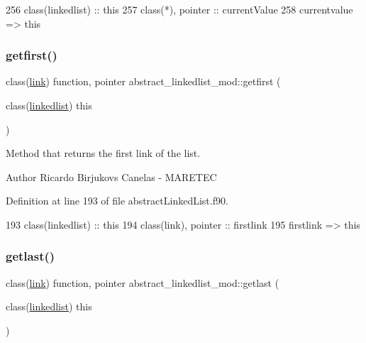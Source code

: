 \begin{DoxyCode}
256     \textcolor{keywordtype}{class}(linkedlist) :: this
257     \textcolor{keywordtype}{class}(*), \textcolor{keywordtype}{pointer} :: currentValue
258     currentvalue => this%
\end{DoxyCode}
\mbox{\label{namespaceabstract__linkedlist__mod_ad7b7ffee891627ae2b0548001650f72b}} 
\subsubsection{\texorpdfstring{getfirst()}{getfirst()}}
{\footnotesize\ttfamily class(\mbox{\hyperlink{structlink__mod_1_1link}{link}}) function, pointer abstract\+\_\+linkedlist\+\_\+mod\+::getfirst (\begin{DoxyParamCaption}\item[{class(\mbox{\hyperlink{structabstract__linkedlist__mod_1_1linkedlist}{linkedlist}})}]{this }\end{DoxyParamCaption})\hspace{0.3cm}{\ttfamily [private]}}



Method that returns the first link of the list. 

\begin{DoxyAuthor}{Author}
Ricardo Birjukovs Canelas -\/ M\+A\+R\+E\+T\+EC 
\end{DoxyAuthor}


Definition at line 193 of file abstract\+Linked\+List.\+f90.


\begin{DoxyCode}
193     \textcolor{keywordtype}{class}(linkedlist) :: this
194     \textcolor{keywordtype}{class}(link), \textcolor{keywordtype}{pointer} :: firstlink
195     firstlink => this%
\end{DoxyCode}
\mbox{\label{namespaceabstract__linkedlist__mod_a7c0a2e5b554e8859fc9b4d8fb52b124f}} 
\subsubsection{\texorpdfstring{getlast()}{getlast()}}
{\footnotesize\ttfamily class(\mbox{\hyperlink{structlink__mod_1_1link}{link}}) function, pointer abstract\+\_\+linkedlist\+\_\+mod\+::getlast (\begin{DoxyParamCaption}\item[{class(\mbox{\hyperlink{structabstract__linkedlist__mod_1_1linkedlist}{linkedlist}})}]{this }\end{DoxyParamCaption})\hspace{0.3cm}{\ttfamily [private]}}



